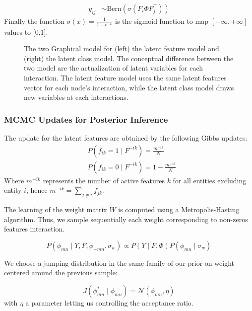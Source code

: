 \documentclass[a4paper, 12pt]{article}
\begin{document}
\begin{align}
y_{ij} &\sim \mathrm{Bern}(\sigma(F_i \Phi F_j^\top))
\end{align}
Finally the function $\sigma(x)= \frac{1}{1 + e^{-x}}$ is the sigmoid function to map $[-\infty, +\infty]$ values to [0,1].

\begin{figure}[h]
	\centering
	\scalebox{0.9}{
	}
	\endminipage
	\scalebox{0.9}{
		}
	\endminipage
	\caption{The two Graphical model for (left) the latent feature model and (right) the latent class model. The conceptual difference between the two model are the actualization of latent variables for each interaction. The latent feature model uses the same latent features vector for each node's interaction, while the latent class model draws new variables at each interactions.}
	\label{fig:ilfrm}
\end{figure}

\subsubsection{MCMC Updates for Posterior Inference}

The update for the latent features are obtained by the following Gibbs updates:
\begin{align}
& P(f_{ik} = 1 \mid F^{-ik}) = \frac{m^{-ik}}{N} \\
& P(f_{ik} = 0 \mid F^{-ik}) = 1 - \frac{m^{-ik}}{N}
\end{align}
Where $m^{-ik}$ represents the number of active features $k$ for all entities excluding entity $i$, hence $m^{-ik} = \sum_{j\neq i}f_{jk}$. 

The learning of the weight matrix $W$ is computed using a Metropolis-Hasting algorithm. Thus, we sample sequentially each weight corresponding to non-zeros features interaction.

\begin{equation}
P(\phi_{mn} \mid Y, F, \phi_{-mn}, \sigma_w) \propto P(Y \mid F, \Phi) P(\phi_{mn} \mid \sigma_w)
\end{equation}

We choose a jumping distribution in the same family of our prior on weight centered around the previous sample:

\begin{equation} \label{eq:j_w}
J(\phi_{mn}^* \mid \phi_{mn}) = \mathcal{N}(\phi_{mn}, \eta)
\end{equation}
with $\eta$ a parameter letting us controlling the acceptance ratio.
\end{document}
